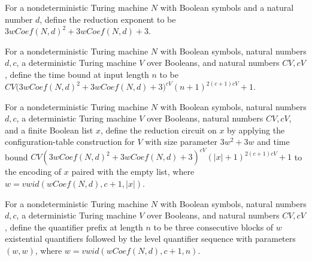 \begin{definition}
\label{Complexity.TQBFHard.redK}
\leanok
{}
For a nondeterministic Turing machine $N$ with Boolean symbols and a natural number $d$,
define the reduction exponent to be $3wCoef(N,d)^2+3wCoef(N,d)+3$.
\end{definition}

\begin{definition}
\label{Complexity.TQBFHard.redT}
\leanok
{}
For a nondeterministic Turing machine $N$ with Boolean symbols, natural numbers $d,c$, a
deterministic Turing machine $V$ over Booleans, and natural numbers $CV,cV$, define the
time bound at input length $n$ to be
$CV\bigl(3wCoef(N,d)^2+3wCoef(N,d)+3\bigr)^{cV}(n+1)^{2(c+1)cV}+1$.
\end{definition}

\begin{definition}
\label{Complexity.TQBFHard.redCircuit}
\leanok
{}
For a nondeterministic Turing machine $N$ with Boolean symbols, natural numbers $d,c$, a
deterministic Turing machine $V$ over Booleans, natural numbers $CV,cV$, and a finite
Boolean list $x$, define the reduction circuit on $x$ by applying the
configuration-table construction for $V$ with size parameter $3w^2+3w$ and time bound
$CV(3wCoef(N,d)^2+3wCoef(N,d)+3)^{cV}(|x|+1)^{2(c+1)cV}+1$ to the encoding of $x$ paired
with the empty list, where $w=vwid(wCoef(N,d),c+1,|x|)$.
\end{definition}

\begin{definition}
\label{Complexity.TQBFHard.redQuants}
\leanok
{}
For a nondeterministic Turing machine $N$ with Boolean symbols, natural numbers $d,c$, a
deterministic Turing machine $V$ over Booleans, and natural numbers $CV,cV$, define the
quantifier prefix at length $n$ to be three consecutive blocks of $w$ existential
quantifiers followed by the level quantifier sequence with parameters $(w,w)$, where
$w=vwid(wCoef(N,d),c+1,n)$.
\end{definition}

